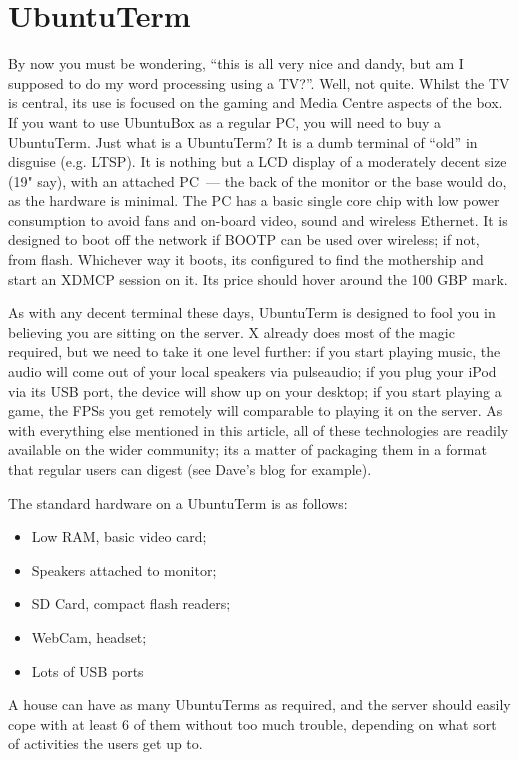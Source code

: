 \documentclass{book}
\begin{document}
\section{UbuntuTerm}

By now you must be wondering, ``this is all very nice and dandy, but
am I supposed to do my word processing using a TV?''. Well, not
quite. Whilst the TV is central, its use is focused on the gaming and
Media Centre aspects of the box. If you want to use UbuntuBox as a
regular PC, you will need to buy a UbuntuTerm. Just what is a
UbuntuTerm? It is a dumb terminal of ``old'' in disguise
(e.g. LTSP). It is nothing but a LCD display of a moderately decent
size (19" say), with an attached PC~--- the back of the monitor or the
base would do, as the hardware is minimal. The PC has a basic single
core chip with low power consumption to avoid fans and on-board video,
sound and wireless Ethernet. It is designed to boot off the network if
BOOTP can be used over wireless; if not, from flash. Whichever way it
boots, its configured to find the mothership and start an XDMCP
session on it. Its price should hover around the 100 GBP mark.

As with any decent terminal these days, UbuntuTerm is designed to fool
you in believing you are sitting on the server. X already does most of
the magic required, but we need to take it one level further: if you
start playing music, the audio will come out of your local speakers
via pulseaudio; if you plug your iPod via its USB port, the device
will show up on your desktop; if you start playing a game, the FPSs
you get remotely will comparable to playing it on the server. As with
everything else mentioned in this article, all of these technologies
are readily available on the wider community; its a matter of
packaging them in a format that regular users can digest (see Dave's
blog for example).

The standard hardware on a UbuntuTerm is as follows:

\begin{itemize}
\item Low RAM, basic video card;
\item Speakers attached to monitor;
\item SD Card, compact flash readers;
\item WebCam, headset;
\item Lots of USB ports
\end{itemize}

A house can have as many UbuntuTerms as required, and the server
should easily cope with at least 6 of them without too much trouble,
depending on what sort of activities the users get up to.
\end{document}
